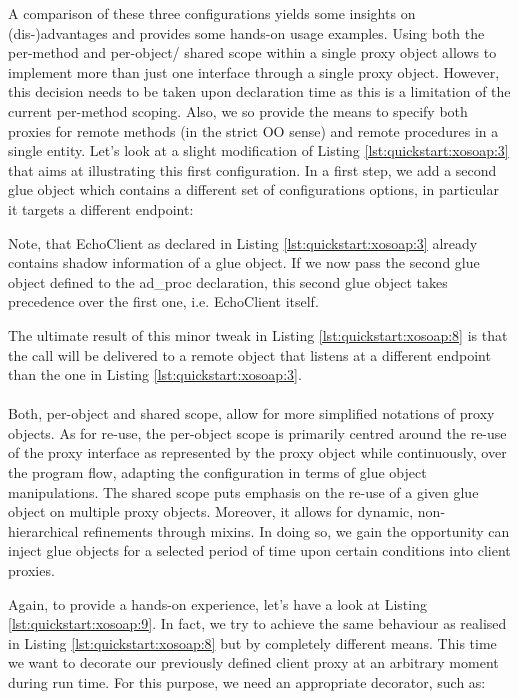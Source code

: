 A comparison of these three configurations yields some insights on (dis-)advantages and provides some  hands-on usage examples. Using both the per-method and per-object/ shared scope within a single proxy object allows to implement more than just one interface through a single proxy object. However, this decision needs to be taken upon declaration time as this is a limitation of the current per-method scoping. Also, we so provide the means to specify both proxies for remote methods (in the strict OO sense) and remote procedures in a single entity. Let's look at a slight modification of Listing \ref{lst:quickstart:xosoap:3} that aims at illustrating this first configuration. In a first step, we add a second glue object which contains a different set of configurations options, in particular it targets a different endpoint:



Note, that EchoClient as declared in Listing \ref{lst:quickstart:xosoap:3} already contains shadow information of a glue object. If we now pass the second glue object defined to the ad\_proc declaration, this second glue object takes precedence over the first one, i.e. EchoClient itself.



The ultimate result of this minor tweak in Listing \ref{lst:quickstart:xosoap:8} is that the call will be delivered to a remote object that listens at a different endpoint than the one in Listing \ref{lst:quickstart:xosoap:3}.\\\\
Both, per-object and shared scope, allow for more simplified notations of proxy objects.  As for re-use, the per-object scope is primarily centred around the re-use of the proxy interface as represented by the proxy object while continuously, over the program flow, adapting the configuration in terms of glue object manipulations. The shared scope puts emphasis on the re-use of a given glue object on multiple proxy objects. Moreover, it allows for dynamic, non-hierarchical refinements through mixins. In doing so, we gain the opportunity can inject glue objects for a selected period of time upon certain conditions into client proxies. 

Again, to provide a hands-on experience, let's have a look at Listing \ref{lst:quickstart:xosoap:9}. In fact, we try to achieve the same behaviour as realised in Listing \ref{lst:quickstart:xosoap:8} but by completely different means. This time we want to decorate our previously defined client proxy at an arbitrary moment during run time. For this purpose, we need an appropriate decorator, such as:


